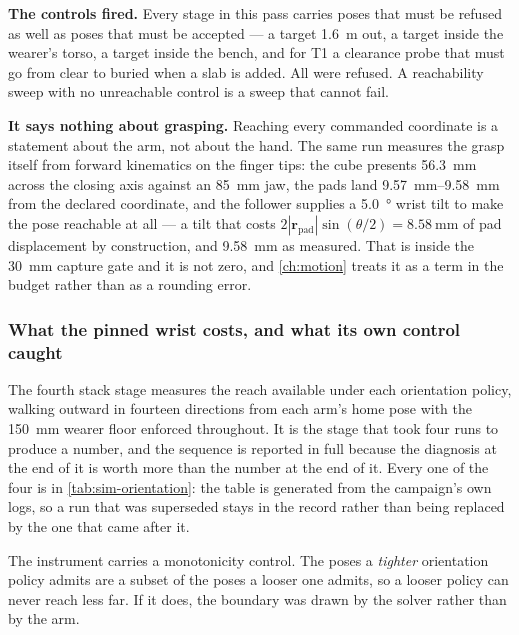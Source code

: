 \textbf{The controls fired.} Every stage in this pass carries poses that must
be refused as well as poses that must be accepted --- a target
\SI{1.6}{\metre} out, a target inside the wearer's torso, a target inside the
bench, and for T1 a clearance probe that must go from clear to buried when a
slab is added. All were refused. A reachability sweep with no unreachable
control is a sweep that cannot fail.

\textbf{It says nothing about grasping.} Reaching every commanded coordinate
is a statement about the arm, not about the hand. The same run measures the
grasp itself from forward kinematics on the finger tips: the cube presents
\SI{56.3}{\milli\metre} across the closing axis against an
\SI{85}{\milli\metre} jaw, the pads land \SIrange{9.57}{9.58}{\milli\metre}
from the declared coordinate, and the follower supplies a \SI{5.0}{\degree}
wrist tilt to make the pose reachable at all --- a tilt that costs
$2|\mathbf{r}_{\text{pad}}|\sin(\theta/2) = \SI{8.58}{\milli\metre}$ of pad
displacement by construction, and \SI{9.58}{\milli\metre} as measured. That
is inside the \SI{30}{\milli\metre} capture gate and it is not zero, and
\cref{ch:motion} treats it as a term in the budget rather than as a rounding
error.

\subsubsection{What the pinned wrist costs, and what its own control caught}
\label{sec:sim-orientation}

The fourth stack stage measures the reach available under each orientation
policy, walking outward in fourteen directions from each arm's home pose with
the \SI{150}{\milli\metre} wearer floor enforced throughout. It is the stage
that took four runs to produce a number, and the sequence is reported in full
because the diagnosis at the end of it is worth more than the number at the
end of it. Every one of the four is in \cref{tab:sim-orientation}: the table
is generated from the campaign's own logs, so a run that was superseded stays
in the record rather than being replaced by the one that came after it.

The instrument carries a monotonicity control. The poses a \emph{tighter}
orientation policy admits are a subset of the poses a looser one admits, so a
looser policy can never reach less far. If it does, the boundary was drawn by
the solver rather than by the arm.

\begin{table}[htbp]
  \centering
  \small
  \caption[Reach against orientation policy, at each sampling density]{The
  same measurement at every seed count it was run at. Mean reach over
  \num{28} directional walks, by how tightly the commanded wrist is
  constrained; the \emph{pinned} row is what teleoperation actually runs.
  Generated from the campaign's own logs, so a further run adds a column
  rather than replacing one --- which is the point, because the finding here
  is the difference between the columns.}
  \label{tab:sim-orientation}
  
\end{table}

